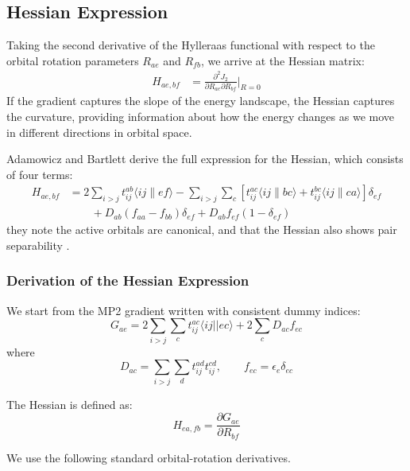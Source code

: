 \subsection{Hessian Expression}

Taking the second derivative of the Hylleraas functional with respect to the orbital rotation parameters $R_{ae}$ and $R_{fb}$, we arrive at the Hessian matrix:
\begin{align}
    H_{ae,bf} &= \frac{\partial^2 J_2}{\partial R_{ae} \partial R_{bf}} \bigg|_{R=0}
\end{align}
If the gradient captures the slope of the energy landscape, the Hessian captures the curvature, providing information about how the energy changes as we move in different directions in orbital space.

Adamowicz and Bartlett derive the full expression for the Hessian, which consists of four terms:
\begin{align}
    H_{ae,bf} &= 2\sum_{i>j} t_{ij}^{ab}\langle ij\|ef\rangle
               - \sum_{i>j}\sum_c [t_{ij}^{ac}\langle ij\|bc\rangle
               + t_{ij}^{bc}\langle ij\|ca\rangle] \delta_{ef}
               \\ &\qquad + D_{ab}(f_{aa} - f_{bb}) \delta_{ef}
               + D_{ab} f_{ef}(1-\delta_{ef})
\end{align}
they note the active orbitals are canonical, and that the Hessian also shows pair separability \cite{Adamowicz1987}. 

\subsubsection{Derivation of the Hessian Expression}

We start from the MP2 gradient written with consistent dummy indices:
\begin{equation}
    G_{ae} = 2\sum_{i>j}\sum_c t_{ij}^{ac}\langle ij||ec\rangle + 2\sum_c D_{ac}f_{ec}
\end{equation}
where
\begin{equation}
    D_{ac} = \sum_{i>j}\sum_d t_{ij}^{ad}t_{ij}^{cd}, 
    \qquad 
    f_{ec} = \epsilon_e \delta_{ec}
\end{equation}

The Hessian is defined as:
\begin{equation}
    H_{ea,fb} = \frac{\partial G_{ae}}{\partial R_{bf}}
\end{equation}

We use the following standard orbital-rotation derivatives.

